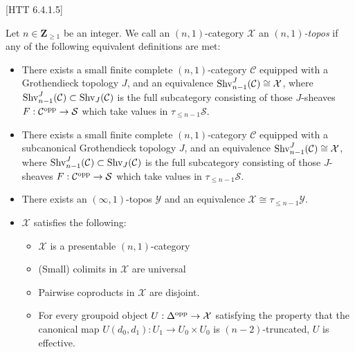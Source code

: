 \documentclass[10pt]{article}
\newcommand{\mS}{\mathcal S}
\newcommand{\C}{\mathcal C}
\newcommand{\cX}{\mathcal{X}}
\newcommand{\cY}{\mathcal{Y}}
\newcommand{\ZZ}{\mathbb{Z}}
\def\ZZ{{\mathbf Z}}
\theoremstyle{witharg}
\theoremstyle{witharg}
\theoremstyle{witharg2}
\begin{document}
\begin{definition}{}[HTT 6.4.1.5]\label{n Topoi definition}

    Let $n\in \ZZ_{\geq 1}$ be an integer. We call an $(n,1)$-category $\cX$ an \emph{$(n,1)$-topos} if any of the following equivalent definitions are met:

    \begin{itemize}
        \item [(1)] There exists a small finite complete $(n,1)$-category $\C$ equipped with a Grothendieck topology $J$, and an equivalence $\textnormal{Shv}^{J}_{n-1}(\C)\cong \cX$, where $\textnormal{Shv}^{J}_{n-1}(\C)\subset \textnormal{Shv}_J(\C)$ is the full subcategory consisting of those $J$-sheaves $F:\C^{\textnormal{opp}}\rightarrow \mS$ which take values in $\tau_{\leq n-1}\mS$.

        \item [$(1^\prime)$] There exists a small finite complete $(n,1)$-category $\C$ equipped with a subcanonical Grothendieck topology $J$, and an equivalence $\textnormal{Shv}^{J}_{n-1}(\C)\cong \cX$, where $\textnormal{Shv}^{J}_{n-1}(\C)\subset \textnormal{Shv}_J(\C)$ is the full subcategory consisting of those $J$-sheaves $F:\C^{\textnormal{opp}}\rightarrow \mS$ which take values in $\tau_{\leq n-1}\mS$.

        \item [(2)] There exists an $(\infty,1)$-topos $\cY$ and an equivalence $\cX\cong \tau_{\leq n-1}\cY$. 

        \item [(3)] $\cX$ satisfies the following:

        \begin{itemize}
            \item [(a)] $\cX$ is a presentable $(n,1)$-category
            
            \item [(b)] (Small) colimits in $\cX$ are universal 
            
            \item [(c)] Pairwise coproducts in $\cX$ are disjoint. 

            \item [(d)] For every groupoid object $U:\Delta^{\textnormal{opp}}\rightarrow \cX$ satisfying the property that the canonical map $U(d_0,d_1):U_1\rightarrow U_0\times U_0$ is $(n-2)$-truncated, $U$ is effective. 
            
        \end{itemize}
    \end{itemize}
    
\end{definition}
\end{document}
